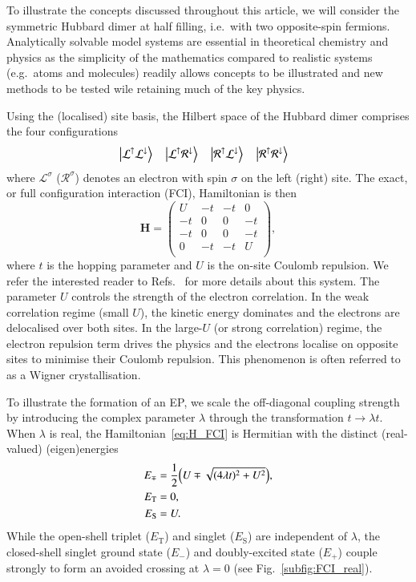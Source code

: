 \documentclass[aps,prb,reprint,noshowkeys,superscriptaddress]{revtex4-1}
\newcommand{\latin}[1]{#1}
\newcommand{\ie}{\latin{i.e.}}
\newcommand{\bH}{\mathbf{H}}
\newcommand{\Lup}{\mathcal{L}^{\uparrow}}
\newcommand{\Ldown}{\mathcal{L}^{\downarrow}}
\newcommand{\Lsi}{\mathcal{L}^{\sigma}}
\newcommand{\Rup}{\mathcal{R}^{\uparrow}}
\newcommand{\Rdown}{\mathcal{R}^{\downarrow}}
\newcommand{\Rsi}{\mathcal{R}^{\sigma}}
\begin{document}
To illustrate the concepts discussed throughout this article, we will consider the symmetric Hubbard dimer at half filling, \ie\ with two opposite-spin fermions.
Analytically solvable model systems are essential in theoretical chemistry and physics as the simplicity of the
mathematics compared to realistic systems (e.g.\ atoms and molecules) readily allows concepts to be illustrated and new methods to be tested wile retaining much 
of the key physics.

Using the (localised) site basis, the Hilbert space of the Hubbard dimer comprises the four configurations
\begin{align}
& \ket{\Lup \Ldown} &  & \ket{\Lup\Rdown} &  & \ket{\Rup\Ldown} &  & \ket{\Rup\Rdown}
\end{align}
where $\Lsi$ ($\Rsi$) denotes an electron with spin $\sigma$ on the left (right) site.
The exact, or full configuration interaction (FCI), Hamiltonian is then 
\begin{equation}
\label{eq:H_FCI}
	\bH = 
	\begin{pmatrix}
		U &	- t & -  t & 0	\\
	   -  t &  0 &  0 & -  t \\
       -  t &  0 &  0 & -  t \\
        0 & -  t & -  t & U \\
	\end{pmatrix},
\end{equation}
where $t$ is the hopping parameter and $U$ is the on-site Coulomb repulsion.
We refer the interested reader to Refs.~ for more details about this system.
The parameter $U$ controls the strength of the electron correlation.
In the weak correlation regime (small $U$), the kinetic energy dominates and the electrons are delocalised over both sites.
In the large-$U$ (or strong correlation) regime, the electron repulsion term drives the physics and the electrons localise on opposite sites to minimise their Coulomb repulsion. 
This phenomenon is often referred to as a Wigner crystallisation. \cite{Wigner_1934}

To illustrate the formation of an EP, we scale the off-diagonal coupling strength by introducing the complex parameter $\lambda$ through the transformation $t\rightarrow \lambda t$.
When $\lambda$ is real, the Hamiltonian~\eqref{eq:H_FCI} is Hermitian with the distinct (real-valued) (eigen)energies
\begin{subequations}
\begin{align}
E_{\mp} &= \frac{1}{2} \qty(U \mp \sqrt{ (4 \lambda t)^2 + U^2 } ),
\label{eq:singletE}
\\
E_{\text{T}} &= 0,
\\
E_{\text{S}} &= U.
\end{align}
\end{subequations}
While the open-shell triplet ($E_{\text{T}}$) and singlet ($E_{\text{S}}$) are independent of $\lambda$, the closed-shell singlet ground state ($E_{-}$) and doubly-excited state ($E_{+}$) couple strongly to form an avoided crossing at $\lambda=0$ (see Fig.~\ref{subfig:FCI_real}).
\end{document}
